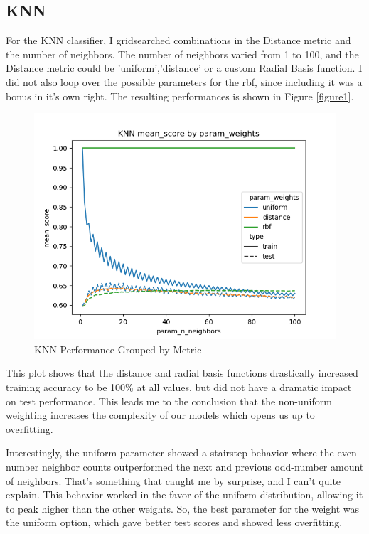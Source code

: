 \documentclass[12pt]{article}
\begin{document}
\subsection{KNN}
For the KNN classifier, I gridsearched combinations in the Distance metric and the number of neighbors. 
The number of neighbors varied from 1 to 100, and the Distance metric could be 'uniform','distance' or a 
custom Radial Basis function. I did not also loop over the possible parameters for the rbf, since including it was a
bonus in it's own right. The resulting performances is shown in Figure \ref{figure1}.


\begin{figure}
  \includegraphics[width=.95\textwidth]{../results/knn/param_weights_mean_score_param_n_neighbors.png}
  \caption{KNN Performance Grouped by Metric}
  \label{figure2}
\end{figure}

This plot shows that the distance and radial basis functions drastically increased training accuracy to be 100\% at all 
values, but did not have a dramatic impact on test performance. This leads me to the conclusion that the non-uniform 
weighting increases the complexity of our models which opens us up to overfitting.

Interestingly, the uniform parameter showed a stairstep behavior where the even number neighbor counts outperformed
the next and previous odd-number amount of neighbors. That's something that caught me by surprise, and I can't quite explain.
This behavior worked in the favor of the uniform distribution, allowing it to peak higher than the other weights. So, 
the best parameter for the weight was the uniform option, which gave better test scores and showed less overfitting.
\end{document}
